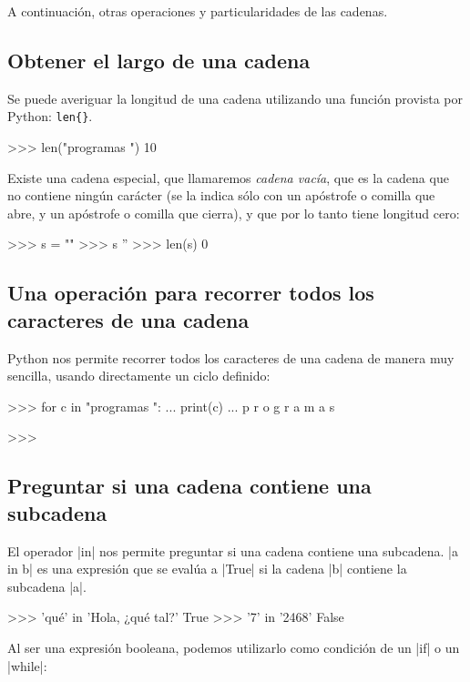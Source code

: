A continuación, otras operaciones y particularidades de las cadenas.

\subsection{Obtener el largo de una cadena}

Se puede averiguar la longitud de una cadena utilizando
una función provista por Python: \lstinline+len{}+.
\begin{codigo-python-sn}
>>> len("programas ")
10
\end{codigo-python-sn}

Existe una cadena especial, que llamaremos \emph{cadena vacía}, que
es la cadena que no contiene ningún carácter (se la indica sólo con
un apóstrofe o comilla que abre, y un apóstrofe o comilla que cierra),
y que por lo tanto tiene longitud cero:

\begin{codigo-python-sn}
>>> s = ""
>>> s
''
>>> len(s)
0
\end{codigo-python-sn}

\subsection[Recorrer una cadena]{Una operación para recorrer todos los caracteres de una cadena}

Python nos permite recorrer todos los caracteres de una cadena de
manera muy sencilla, usando directamente un ciclo definido:

\begin{codigo-python-sn}
>>> for c in "programas ":
...     print(c)
...
p
r
o
g
r
a
m
a
s

>>>
\end{codigo-python-sn}

\subsection{Preguntar si una cadena contiene una subcadena}

El operador |in| nos permite preguntar si una cadena contiene una
subcadena. |a in b| es una expresión que se evalúa a |True| si la cadena |b|
contiene la subcadena |a|.

\begin{codigo-python-sn}
>>> 'qué' in 'Hola, ¿qué tal?'
True
>>> '7' in '2468'
False
\end{codigo-python-sn}

Al ser una expresión booleana, podemos utilizarlo como condición de un |if| o
un |while|:

